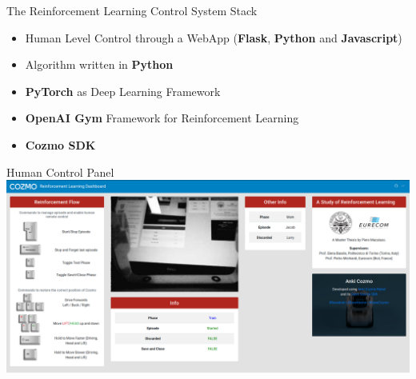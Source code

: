 \documentclass[aspectratio=169,handout]{beamer}
\begin{document}
\begin{frame}{The Reinforcement Learning Control System Stack}
	\begin{itemize}
		\item<1->{ Human Level Control through a WebApp (\textbf{Flask}, \textbf{Python} and \textbf{Javascript})}
\item<1->{Algorithm written in \textbf{Python}}
		\item<1->{\textbf{PyTorch} as Deep Learning Framework}
		\item<1->{\textbf{OpenAI Gym} Framework for Reinforcement Learning}
		\item<1->{\textbf{Cozmo SDK}}
	\end{itemize}
\end{frame}

\begin{frame}{Human Control Panel}
	\includegraphics[width=1\linewidth]{img/dashboard.png}
\end{frame}
\end{document}
